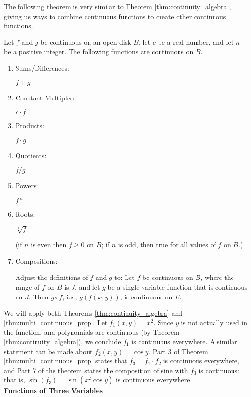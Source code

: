The following theorem is very similar to Theorem \ref{thm:continuity_algebra}, giving us ways to combine continuous functions to create other continuous functions.

{Let $f$ and $g$ be continuous on an open disk $B$, let $c$ be a real number, and let $n$ be a positive integer. The following functions are continuous on $B$.
		\begin{enumerate}
		\item		\parbox{80pt}{Sums/Differences:}	$f\pm g$
		\item		\parbox{80pt}{Constant Multiples:}	$c\cdot f$
		\item		\parbox{80pt}{Products:}	$f\cdot g$
		\item		\parbox{80pt}{Quotients:}	$f/g$ 
		\item		\parbox{80pt}{Powers:}	$f\,^n$
		\item		\parbox{80pt}{Roots:}	$\sqrt[n]{f}$ \qquad \parbox[t]{150pt}{\small (if $n$ is even then $f\geq 0$ on $B$; if $n$ is odd, then true for all values of $f$ on $B$.)}
		\item		\parbox{80pt}{Compositions:}\parbox[t]{185pt}{Adjust the definitions of $f$ and $g$ to: Let $f$ be continuous on $B$, where the range of $f$ on $B$ is $J$, and let $g$ be a single variable function that is continuous on $J$. Then $g\circ f$, i.e., $g(f(x,y))$, is continuous on $B$.}
		\end{enumerate}
}
\enlargethispage{\baselineskip}

{We will apply both Theorems \ref{thm:continuity_algebra} and \ref{thm:multi_continuous_prop}. Let $f_1(x,y) = x^2$. Since $y$ is not actually used in the function, and polynomials are continuous (by Theorem \ref{thm:continuity_algebra}), we conclude $f_1$ is continuous everywhere. A similar statement can be made about $f_2(x,y) = \cos y$. Part 3 of Theorem \ref{thm:multi_continuous_prop} states that $f_3=f_1\cdot f_2$ is continuous everywhere, and Part 7 of the theorem states the composition of sine with $f_3$ is continuous: that is, $\sin (f_3) = \sin(x^2\cos y)$ is continuous everywhere.
}\\

\noindent\textbf{\large Functions of Three Variables}\\


